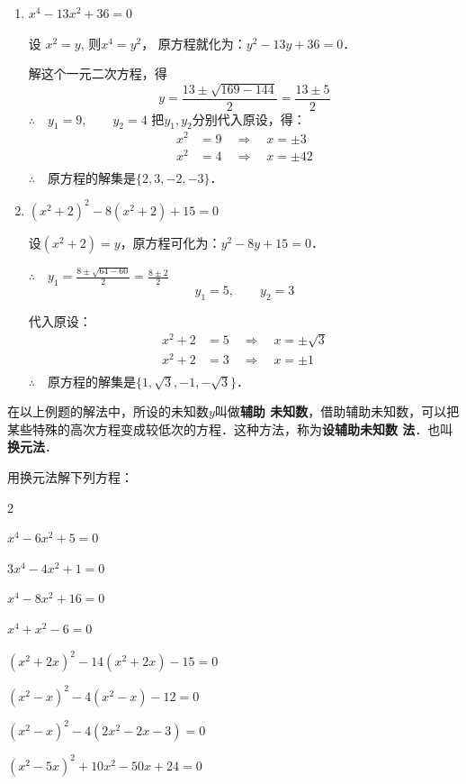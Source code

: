\begin{solution}
\begin{enumerate}
    \item $x^4-13x^2+36=0$

    设 $x^2=y$, 则$x^4=y^2$，
    原方程就化为：$y^2-13y+36=0$．

    解这个一元二次方程，得
\[y=\frac{13\pm \sqrt{169-144}}{2}=\frac{13\pm 5}{2}\]
$\therefore\quad y_1=9,\qquad y_2=4$
把$y_1,y_2$分别代入原设，得：
\begin{align*}
    x^2&=9 \quad \Rightarrow\quad  x=\pm 3\\
    x^2&=4 \quad \Rightarrow\quad  x=\pm 42\\
\end{align*}
$\therefore\quad $原方程的解集是$\{2,3,-2,-3\}$．

\item $(x^2+2)^2-8(x^2+2)+15=0$

设$(x^2+2)=y$，原方程可化为：$y^2-8y+15=0$．

$\therefore\quad y_1=\frac{8\pm\sqrt{64-60}}{2}=\frac{8\pm 2}{2}$
\[y_1=5,\qquad y_2=3\]

代入原设：
\begin{align*}
    x^2+2&=5 \quad \Rightarrow\quad  x=\pm\sqrt{3}\\
    x^2+2&=3 \quad \Rightarrow\quad  x=\pm 1\\
\end{align*}
$\therefore\quad $原方程的解集是$\{1,\sqrt{3},-1,-\sqrt{3}\}$．

\end{enumerate}    
\end{solution}

在以上例题的解法中，所设的未知数$y$叫做\textbf{辅助
未知数}，借助辅助未知数，可以把某些特殊的高次方程变成较低次的方程．这种方法，称为\textbf{设辅助未知数
法}．也叫\textbf{换元法}．

\begin{ex}
    用换元法解下列方程：
    
\begin{enumerate}
    \begin{multicols}{2}
   \item $x^4-6x^2+5=0$
    \item $3x^4-4x^2+1=0$
    \item $x^4-8x^2+16=0$
    \item $x^4+x^2-6=0$

    \item $(x^2+2x)^2-14(x^2+2x)-15=0$
    \item $(x^2-x)^2-4(x^2-x)-12=0$
    \item $(x^2-x)^2-4(2x^2-2x-3)=0$
    \item $(x^2-5x)^2+10x^2-50x+24=0$
    \end{multicols}
\end{enumerate}        
    

\end{ex}

